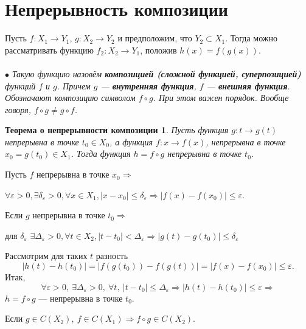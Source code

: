 \section{Непрерывность композиции}
Пусть $f: X_1 \rightarrow Y_1$, $g: X_2 \rightarrow Y_2$ и предположим, что $Y_2 \subset X_1$. Тогда можно рассматривать функцию $f_2: X_2 \rightarrow Y_1$, положив $h(x) = f(g(x))$.\\\\
$\bullet$ \textit{Такую функцию назовём \textbf{композицией (сложной функцией, суперпозицией)} функций $f$ и $g$. Причем $g$ --- \textbf{внутренняя функция}, $f$ --- \textbf{внешняя функция}. Обозначают композицию символом $f \circ g$. При этом важен порядок. Вообще говоря, $f \circ g \ne g \circ f$.}
\newtheorem*{theorem_4}{Теорема о непрерывности композиции}
\begin{theorem_4}
	Пусть функция $g: t \rightarrow g(t)$ непрерывна в точке $t_0 \in X_0$, а функция $f: x \rightarrow f(x)$, непрерывна в точке $x_0 = g(t_0) \in X_1$.
	Тогда функция $h = f \circ g$ непрерывна в точке $t_0$.
\end{theorem_4}
\begin{Proof}
	Пусть $f$ непрерывна в точке $x_0 \Rightarrow$
	\begin{center} $\forall \varepsilon > 0, \exists \delta_{\varepsilon} > 0, \forall x \in X_1, |x-x_0| \leqslant \delta_{\varepsilon} \Rightarrow |f(x) - f(x_0)| \leqslant \varepsilon.$\\ \end{center}
	Если $g$ непрерывна в точке $t_0 \Rightarrow$
	\begin{center} для $\delta_{\varepsilon}$ $\exists \Delta_{\varepsilon} > 0, \forall t \in X_2, |t-t_0| < \Delta_{\varepsilon} \Rightarrow |g(t)-g(t_0)| \leqslant \delta_{\varepsilon}$\\ \end{center}
	Рассмотрим для таких $t$ разность
	$$|h(t) - h(t_0)| = |f(g(t_0)) - f(g(t))| = |f(x) - f(x_0)| \leqslant \varepsilon.$$
	Итак, $$\forall \varepsilon >0,\ \exists \Delta_{\varepsilon} >0,\ \forall t,\ |t - t_0| \leqslant \Delta_{\varepsilon} \Rightarrow |h(t) - h(t_0)| \leqslant \varepsilon \Rightarrow$$ $h = f \circ g$ --- непрерывна в точке $t_0$.
\end{Proof}
\begin{corollary}
	Если $g \in C(X_2),\ f \in C(X_1) \Rightarrow f \circ g \in C(X_2)$.
\end{corollary}
